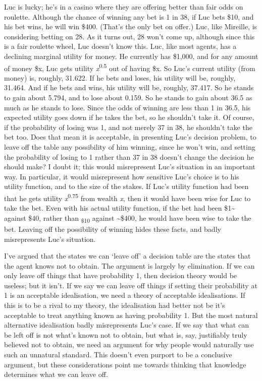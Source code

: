 \documentclass[
  11pt,
]{book}
\begin{document}
Luc is lucky; he's in a casino where they are offering better than fair odds on roulette. Although the chance of winning any bet is 1 in 38, if Luc bets \$10, and his bet wins, he will win \$400. (That's the only bet on offer.) Luc, like Mireille, is considering betting on 28. As it turns out, 28 won't come up, although since this is a fair roulette wheel, Luc doesn't know this. Luc, like most agents, has a declining marginal utility for money. He currently has \$1,000, and for any amount of money \$x, Luc gets utility \emph{x}\textsuperscript{0.5} out of having \$x. So Luc's current utility (from money) is, roughly, 31.622. If he bets and loses, his utility will be, roughly, 31.464. And if he bets and wins, his utility will be, roughly, 37.417. So he stands to gain about 5.794, and to lose about 0.159. So he stands to gain about 36.5 as much as he stands to lose. Since the odds of winning are less than 1 in 36.5, his expected utility goes down if he takes the bet, so he shouldn't take it. Of course, if the probability of losing was 1, and not merely 37 in 38, he shouldn't take the bet too. Does that mean it is acceptable, in presenting Luc's decision problem, to leave off the table any possibility of him winning, since he won't win, and setting the probability of losing to 1 rather than 37 in 38 doesn't change the decision he should make? I doubt it; this would misrepresent Luc's situation in an important way. In particular, it would misrepresent how sensitive Luc's choice is to his utility function, and to the size of the stakes. If Luc's utility function had been that he gets utility \emph{x}\textsuperscript{0.75} from wealth \emph{x}, then it would have been wise for Luc to take the bet. Even with his actual utility function, if the bet had been \$1\textasciitilde{} against \$40, rather than \textsubscript{\$10} against \textasciitilde\$400, he would have been wise to take the bet. Leaving off the possibility of winning hides these facts, and badly misrepresents Luc's situation.

I've argued that the states we can `leave off' a decision table are the states that the agent knows not to obtain. The argument is largely by elimination. If we can only leave off things that have probability 1, then decision theory would be useless; but it isn't. If we say we can leave off things if setting their probability at 1 is an acceptable idealisation, we need a theory of acceptable idealisations. If this is to be a rival to my theory, the idealisation had better not be it's acceptable to treat anything known as having probability 1. But the most natural alternative idealisation badly misrepresents Luc's case. If we say that what can be left off is not what's known not to obtain, but what is, say, justifiably truly believed not to obtain, we need an argument for why people would naturally use such an unnatural standard. This doesn't even purport to be a conclusive argument, but these considerations point me towards thinking that knowledge determines what we can leave off.
\end{document}

